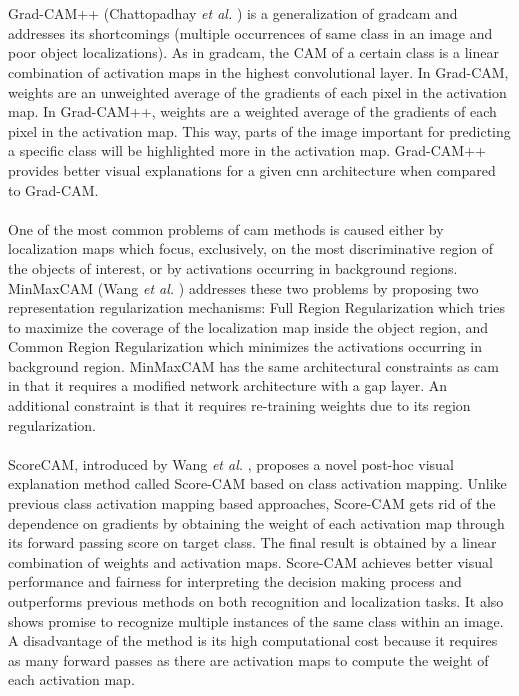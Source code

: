 \\\\
Grad-CAM++ (Chattopadhay \textit{et al.} \cite{chattopadhay2018grad}) is a generalization of \acrshort{gradcam} and addresses its shortcomings (multiple occurrences of same class in an image and poor object localizations). As in \acrshort{gradcam}, the CAM of a certain class is a linear combination of activation maps in the highest convolutional layer. In Grad-CAM, weights are an unweighted average of the gradients of each pixel in the activation map. In Grad-CAM++, weights are a weighted average of the gradients of each pixel in the activation map. This way, parts of the image important for predicting a specific class will be highlighted more in the activation map. Grad-CAM++ provides better visual explanations for a given \acrshort{cnn} architecture when compared to Grad-CAM.
\\\\
One of the most common problems of \acrshort{cam} methods is caused either by localization maps which focus, exclusively, on the most discriminative region of the objects of interest, or by activations occurring in background regions. MinMaxCAM (Wang \textit{et al.} \cite{wang2021minmaxcam}) addresses these two problems by proposing two representation regularization mechanisms: Full Region Regularization which tries to maximize the coverage of the localization map inside the object region, and Common Region Regularization which minimizes the activations occurring in background region. MinMaxCAM has the same architectural constraints as \acrshort{cam} in that it requires a modified network architecture with a \acrshort{gap} layer. An additional constraint is that it requires re-training weights due to its region regularization.
\\\\
ScoreCAM, introduced by Wang \textit{et al.} \cite{wang2020score}, proposes a novel post-hoc visual explanation method called Score-CAM based on class activation mapping. Unlike previous class activation mapping based approaches, Score-CAM gets rid of the dependence on gradients by obtaining the weight of each activation map through its forward passing score on target class. The final result is obtained by a linear combination of weights and activation maps. Score-CAM achieves better visual performance and fairness for interpreting the decision making process and outperforms previous methods on both recognition and localization tasks. It also shows promise to recognize multiple instances of the same class within an image. A disadvantage of the method is its high computational cost because it requires as many forward passes as there are activation maps to compute the weight of each activation map. 

